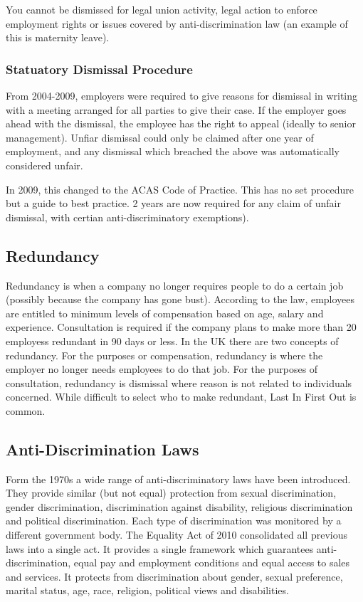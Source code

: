 \documentclass{article}
\begin{document}
	You cannot be dismissed for legal union activity, legal action to enforce employment rights or issues covered by anti-discrimination law (an example of this is maternity leave).
	
	\subsubsection{Statuatory Dismissal Procedure}
	From 2004-2009, employers were required to give reasons for dismissal in writing with a meeting arranged for all parties to give their case. If the employer goes ahead with the dismissal, the employee has the right to appeal (ideally to senior management). Unfiar dismissal could only be claimed after one year of employment, and any dismissal which breached the above was automatically considered unfair. 
	
	\par In 2009, this changed to the ACAS Code of Practice. This has no set procedure but a guide to best practice. 2 years are now required for any claim of unfair dismissal, with certian anti-discriminatory exemptions).
	\subsection{Redundancy}
	Redundancy is when a company no longer requires people to do a certain job (possibly because the company has gone bust). According to the law, employees are entitled to minimum levels of compensation based on age, salary and experience. Consultation is required if the company plans to make more than 20 employess redundant in 90 days or less. In the UK there are two concepts of redundancy. For the purposes or compensation, redundancy is where the employer no longer needs employees to do that job. For the purposes of consultation, redundancy is dismissal where reason is not related to individuals concerned. While difficult to select who to make redundant, Last In First Out is common.
	
	\subsection{Anti-Discrimination Laws}
	Form the 1970s a wide range of anti-discriminatory laws have been introduced. They provide similar (but not equal) protection from sexual discrimination, gender discrimination, discrimination against disability, religious discrimination and political discrimination. Each type of discrimination was monitored by a different government body. The Equality Act of 2010 consolidated all previous laws into a single act. It provides a single framework which guarantees anti-discrimination, equal pay and employment conditions and equal access to sales and services. It protects from discrimination about gender, sexual preference, marital status, age, race, religion, political views and disabilities. 
	
\end{document}
